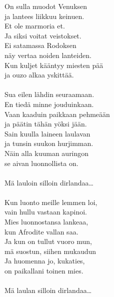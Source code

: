 
        On sulla muodot Venuksen \\
        ja lantees liikkuu keinuen. \\
        Et ole marmoria et. \\
        Ja siksi voitat veistokset. \\
        Ei satamassa Rodoksen \\
        näy vertaa noiden lanteiden. \\
        Kun kuljet kääntyy miesten pää \\
        ja ouzo alkaa yskittää. \\
\hspace{10mm} \\
        Sua eilen lähdin seuraamaan. \\
        En tiedä minne jouduinkaan. \\
        Vaan kaaduin paikkaan pehmeään \\
        ja päätin tähän yöksi jään. \\
        Sain kuulla laineen laulavan \\
        ja tunsin suukon hurjimman. \\
        Näin alla kuuman auringon \\
        se aivan luonnollista on. \\
\hspace{10mm} \\
        Mä lauloin silloin dirlandaa… \\
\hspace{10mm} \\
        Kun luonto meille lemmen loi, \\
        vain hullu vastaan kapinoi. \\
        Mies luonnostansa lankeaa, \\
        kun Afrodite vallan saa. \\
        Ja kun on tullut vuoro mun, \\
        mä suostun, siihen mukaudun \\
        Ja huomenna jo, kukaties, \\
        on paikallani toinen mies. \\
\hspace{10mm} \\
        Mä laulan silloin dirlandaa… \\

